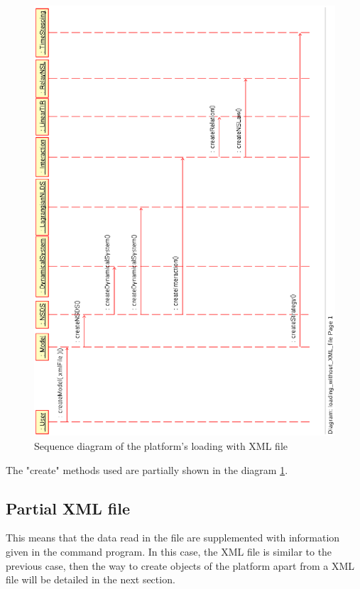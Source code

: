 \begin{figure}
\begin{center}
	\includegraphics[scale=0.75, clip]{figure/platform_loading_XML.ps}
	\caption{Sequence diagram of the platform's loading with XML file}
	\label{fig: platform's loading1}
\end{center}
\end{figure}
The "create" methods used are partially shown in the diagram \ref{fig: platform's loading1}.

\subsection{Partial XML file}
This means that the data read in the file are supplemented with information given in the command
program.
In this case, the XML file is similar to the previous case, then the way to create objects of
the platform apart from a XML file will be detailed in the next section.

